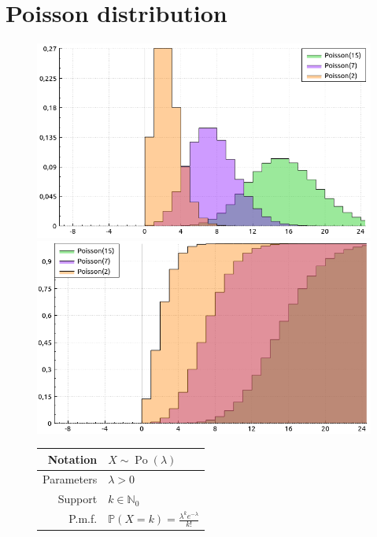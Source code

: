 \documentclass[a4paper,11pt]{article}
\theoremstyle{plain}
\theoremstyle{definition}
\newcommand{\MP}{\mathbb{P}}
\newcommand{\MN}{\mathbb{N}}
\begin{document}
	\section{Poisson distribution}
		\begin{figure}[!htb]\centering
			\begin{minipage}{0.55\textwidth}
				\includegraphics[width=\linewidth, right]{poisson_pmf}
				\captionsetup{labelformat=empty}
				\includegraphics[width=\linewidth, right]{poisson_cdf}
				\captionsetup{labelformat=empty}
			\end{minipage}
			\begin{minipage}{0.4\textwidth}
				\begin{tabular}{| r | l |}
					\hline
					Notation & $ X \sim \operatorname{Po}(\lambda) $ \\
					\hline
					Parameters & $\lambda > 0$ \\
					\hline
					Support & $ k \in \MN_0 $  \\
					\hline
					P.m.f. & $\MP(X = k) = \frac{\lambda^k e^{-\lambda}}{k!}$ \\

\end{tabular}
\end{minipage}
\end{figure}
\end{document}
